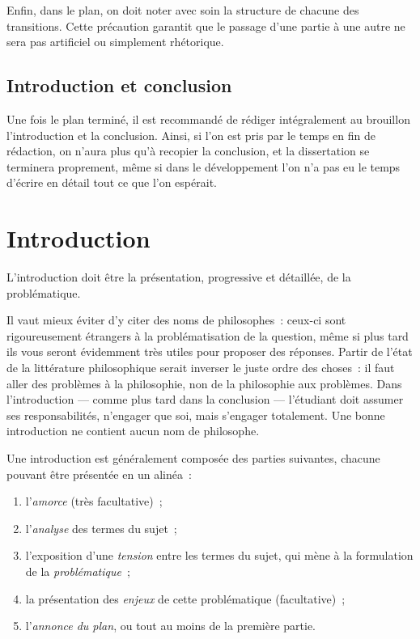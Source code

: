 \documentclass[a4paper,11pt]{article}
\begin{document}
\par

Enfin, dans le plan, on doit noter avec soin la structure de chacune des
transitions. Cette précaution garantit que le passage d'une partie à une
autre ne sera pas artificiel ou simplement rhétorique.

\par

\subsection{Introduction et conclusion}

Une fois le plan terminé, il est recommandé de rédiger intégralement au
brouillon l'introduction et la conclusion. Ainsi, si l'on est pris par
le temps en fin de rédaction, on n'aura plus qu'à recopier la
conclusion, et la dissertation se terminera proprement, même si dans le
développement l'on n'a pas eu le temps d'écrire en détail tout ce que
l'on espérait.




\section{Introduction}

L'introduction doit être la présentation, progressive et détaillée, de
la problématique.

\par

Il vaut mieux éviter d'y citer des noms de philosophes~: ceux-ci sont
rigoureusement étrangers à la problématisation de la question, même si
plus tard ils vous seront évidemment très utiles pour proposer des
réponses. Partir de l'état de la littérature philosophique serait
inverser le juste ordre des choses~: il faut aller des problèmes à la
philosophie, non de la philosophie aux problèmes. Dans l'introduction
--- comme plus tard dans la conclusion --- l'étudiant doit assumer ses
responsabilités, n'engager que soi, mais s'engager totalement. Une bonne
introduction ne contient aucun nom de philosophe.

\par

Une introduction est généralement composée des parties suivantes,
chacune pouvant être présentée en un alinéa~:
\begin{enumerate}
\item l'\emph{amorce} (très facultative)~;
\item l'\emph{analyse} des termes du sujet~;
\item l'exposition d'une \emph{tension} entre les termes du sujet, qui
  mène à la formulation de la \emph{problématique}~;
\item la présentation des \emph{enjeux} de cette problématique
  (facultative)~;
\item l'\emph{annonce du plan}, ou tout au moins de la première partie.
\end{enumerate}
\end{document}
